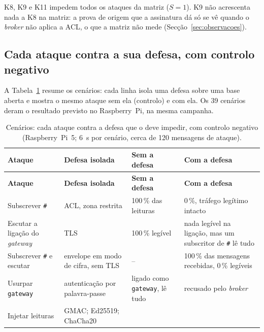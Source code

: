 K8, K9 e K11 impedem todos os ataques da matriz ($S = 1$). K9 não acrescenta
nada a K8 na matriz: a prova de origem que a assinatura dá só se vê quando o
\emph{broker} não aplica a ACL, o que a matriz não mede
(Secção~\ref{sec:observacoes}).

\subsection{Cada ataque contra a sua defesa, com controlo negativo}

A Tabela~\ref{tab:cenarios} resume os cenários: cada linha isola uma defesa sobre
uma base aberta e mostra o mesmo ataque sem ela (controlo) e com ela. Os 39
cenários deram o resultado previsto no Raspberry~Pi, na mesma campanha.

\begin{longtable}{@{}>{\raggedright\arraybackslash}p{3.4cm}>{\raggedright\arraybackslash}p{3.6cm}>{\raggedright\arraybackslash}p{3.3cm}>{\raggedright\arraybackslash}p{4.2cm}@{}}
  \caption{Cenários: cada ataque contra a defesa que o deve impedir, com controlo
    negativo (Raspberry~Pi~5; 6~s por cenário, cerca de 120 mensagens de ataque).}
  \label{tab:cenarios}\\
  \toprule
  \textbf{Ataque} & \textbf{Defesa isolada} & \textbf{Sem a defesa} &
    \textbf{Com a defesa} \\
  \midrule
  \endfirsthead
  \toprule
  \textbf{Ataque} & \textbf{Defesa isolada} & \textbf{Sem a defesa} &
    \textbf{Com a defesa} \\
  \midrule
  \endhead
  \bottomrule
  \endfoot
  \footnotesize Subscrever \texttt{\#} & \footnotesize ACL, zona restrita &
    \footnotesize 100\,\% das leituras & \footnotesize 0\,\%, tráfego legítimo
    intacto \\
  \footnotesize Escutar a ligação do \emph{gateway} & \footnotesize TLS &
    \footnotesize 100\,\% legível & \footnotesize nada legível na ligação, mas um
    subscritor de \texttt{\#} lê tudo \\
  \footnotesize Subscrever \texttt{\#} e escutar & \footnotesize envelope em modo
    de cifra, sem TLS & \footnotesize -- & \footnotesize 100\,\% das mensagens
    recebidas, 0\,\% legíveis \\
  \footnotesize Usurpar \texttt{gateway} & \footnotesize autenticação por
    palavra-passe & \footnotesize ligado como \texttt{gateway}, lê tudo &
    \footnotesize recusado pelo \emph{broker} \\
  \footnotesize Injetar leituras & \footnotesize GMAC; Ed25519; ChaCha20 &

\end{longtable}
